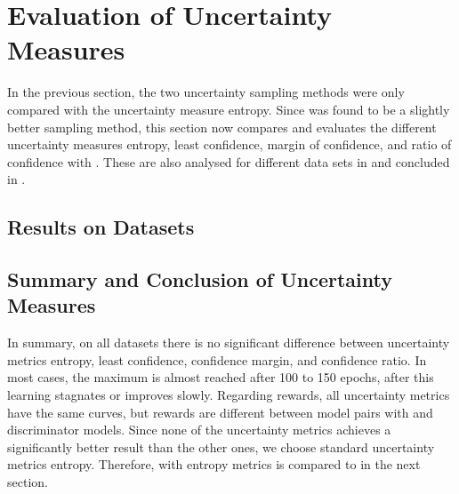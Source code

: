 \section{Evaluation of Uncertainty Measures}
\label{ch:evaluation:sec:evaluation_metrics}
%
In the previous section, the two uncertainty sampling methods were only compared with the uncertainty measure entropy.
Since \ussoftmax was found to be a slightly better sampling method, this section now compares and evaluates the different uncertainty measures entropy, least confidence, margin of confidence, and ratio of confidence with \ussoftmax. 
These are also analysed for different data sets in  and concluded in .
%
\subsection{Results on Datasets} \label{subsec:measures_results}














\subsection{Summary and Conclusion of Uncertainty Measures}
\label{subsec:measure_conclusion}
In summary, on all datasets there is no significant difference between uncertainty metrics entropy, least confidence, confidence margin, and confidence ratio.
In most cases, the maximum is almost reached after 100 to 150 epochs, after this learning stagnates or improves slowly.
Regarding rewards, all uncertainty metrics have the same curves, but rewards are different between model pairs with \transe and \transe discriminator models.
Since none of the uncertainty metrics achieves a significantly better result than the other ones, we choose standard uncertainty metrics entropy.
Therefore, \ussoftmax with entropy metrics is compared to \origsampling in the next section.
\clearpage